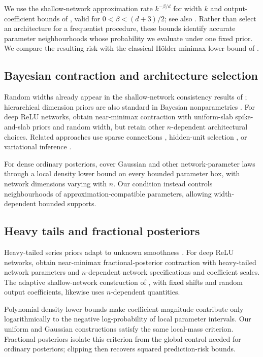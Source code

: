 \documentclass[11pt,a4paper]{article}
\theoremstyle{remark}
\begin{document}
We use the shallow-network approximation rate $k^{-\beta/d}$ for width $k$ and
output-coefficient bounds of \citet[Cor.~2.4(3)]{yangzhou2025}, valid for
$0<\beta<(d+3)/2$; see also \citet{yangzhou2024}. Rather than select
an architecture for a frequentist procedure, these bounds identify
accurate parameter neighbourhoods whose probability we evaluate under
one fixed prior. We compare the resulting risk with the classical
H\"older minimax lower bound of \citet{stone1982}.

\subsection{Bayesian contraction and architecture selection}

Random widths already appear in the shallow-network consistency
results of \citet{lee2000}; hierarchical dimension priors are also
standard in Bayesian nonparametrics \citep{arbel2013}.
For deep ReLU networks, \citet{polsonrockova2018} obtain near-minimax
contraction with uniform-slab spike-and-slab priors and random width,
but retain other $n$-dependent architectural choices. Related
approaches use sparse connections
\citep{leelee2022,leelinparkjeong2025}, hidden-unit selection
\citep{kong2023}, or variational inference
\citep{cherief2020,bai2020,ohnlin2024}.

For dense ordinary posteriors, \citet{kongkim2025} cover Gaussian and
other network-parameter laws through a local density lower bound on every
bounded parameter box, with network dimensions varying with $n$.
Our condition instead controls neighbourhoods of
approximation-compatible parameters, allowing width-dependent
bounded supports.

\subsection{Heavy tails and fractional posteriors}

Heavy-tailed series priors adapt to unknown smoothness
\citep{agapioucastillo2024}. For deep ReLU networks,
\citet{castilloegels2025} obtain near-minimax fractional-posterior
contraction with heavy-tailed network parameters and $n$-dependent network
specifications and coefficient scales. The adaptive shallow-network
construction of \citet{agapiou2026}, with fixed shifts and random
output coefficients, likewise uses $n$-dependent quantities.

Polynomial density lower bounds make coefficient magnitude contribute
only logarithmically to the negative log-probability of local parameter
intervals. Our uniform and Gaussian constructions satisfy the same
local-mass criterion. Fractional posteriors isolate this
criterion from the global control needed for ordinary posteriors;
clipping then recovers squared prediction-risk bounds.
\end{document}
